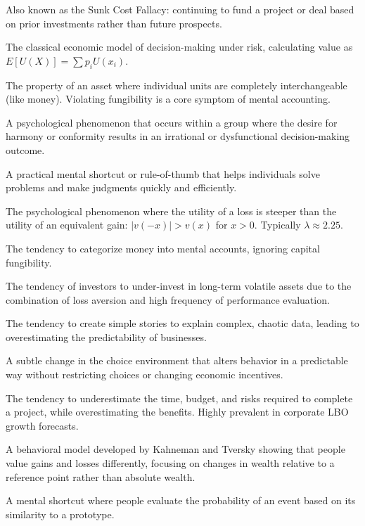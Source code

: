 \documentclass[11pt,a4paper]{article}
\begin{document}
\begin{description}[leftmargin=1.5cm, labelindent=0.5cm]
    \item[Escalation of Commitment] Also known as the Sunk Cost Fallacy: continuing to fund a project or deal based on prior investments rather than future prospects.
    \item[Expected Utility Theory] The classical economic model of decision-making under risk, calculating value as $E[U(X)] = \sum p_i U(x_i)$.
    \item[Fungibility] The property of an asset where individual units are completely interchangeable (like money). Violating fungibility is a core symptom of mental accounting.
    \item[Groupthink] A psychological phenomenon that occurs within a group where the desire for harmony or conformity results in an irrational or dysfunctional decision-making outcome.
    \item[Heuristic] A practical mental shortcut or rule-of-thumb that helps individuals solve problems and make judgments quickly and efficiently.
    \item[Loss Aversion] The psychological phenomenon where the utility of a loss is steeper than the utility of an equivalent gain: $|v(-x)| > v(x)$ for $x > 0$. Typically $\lambda \approx 2.25$.
    \item[Mental Accounting] The tendency to categorize money into mental accounts, ignoring capital fungibility.
    \item[Myopic Loss Aversion] The tendency of investors to under-invest in long-term volatile assets due to the combination of loss aversion and high frequency of performance evaluation.
    \item[Narrative Fallacy] The tendency to create simple stories to explain complex, chaotic data, leading to overestimating the predictability of businesses.
    \item[Nudge] A subtle change in the choice environment that alters behavior in a predictable way without restricting choices or changing economic incentives.
    \item[Planning Fallacy] The tendency to underestimate the time, budget, and risks required to complete a project, while overestimating the benefits. Highly prevalent in corporate LBO growth forecasts.
    \item[Prospect Theory] A behavioral model developed by Kahneman and Tversky showing that people value gains and losses differently, focusing on changes in wealth relative to a reference point rather than absolute wealth.
    \item[Representativeness Heuristic] A mental shortcut where people evaluate the probability of an event based on its similarity to a prototype.

\end{description}
\end{document}
